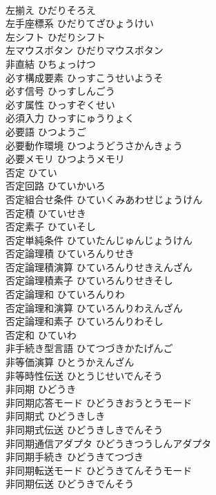\documentclass[8pt]{extreport}
\begin{document}
\begin{CJK}{UTF8}{min}
\\	左揃え	ひだりそろえ	
\\	左手座標系	ひだりてざひょうけい	
\\	左シフト	ひだりシフト	
\\	左マウスボタン	ひだりマウスボタン	
\\	非直結	ひちょっけつ	
\\	必す構成要素	ひっすこうせいようそ	
\\	必す信号	ひっすしんごう	
\\	必す属性	ひっすぞくせい	
\\	必須入力	ひっすにゅうりょく	
\\	必要語	ひつようご	
\\	必要動作環境	ひつようどうさかんきょう	
\\	必要メモリ	ひつようメモリ	
\\	否定	ひてい	
\\	否定回路	ひていかいろ	
\\	否定組合せ条件	ひていくみあわせじょうけん	
\\	否定積	ひていせき	
\\	否定素子	ひていそし	
\\	否定単純条件	ひていたんじゅんじょうけん	
\\	否定論理積	ひていろんりせき	
\\	否定論理積演算	ひていろんりせきえんざん	
\\	否定論理積素子	ひていろんりせきそし	
\\	否定論理和	ひていろんりわ	
\\	否定論理和演算	ひていろんりわえんざん	
\\	否定論理和素子	ひていろんりわそし	
\\	否定和	ひていわ	
\\	非手続き型言語	ひてつづきかたげんご	
\\	非等価演算	ひとうかえんざん	
\\	非等時性伝送	ひとうじせいでんそう	
\\	非同期	ひどうき	
\\	非同期応答モード	ひどうきおうとうモード	
\\	非同期式	ひどうきしき	
\\	非同期式伝送	ひどうきしきでんそう	
\\	非同期通信アダプタ	ひどうきつうしんアダプタ	
\\	非同期手続き	ひどうきてつづき	
\\	非同期転送モード	ひどうきてんそうモード	
\\	非同期伝送	ひどうきでんそう	

\end{CJK}
\end{document}
